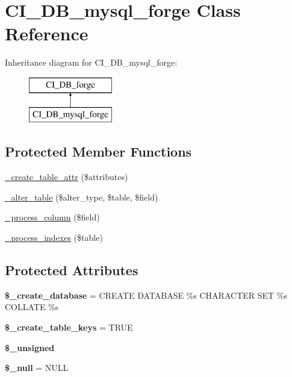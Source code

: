 \hypertarget{class_c_i___d_b__mysql__forge}{}\section{C\+I\+\_\+\+D\+B\+\_\+mysql\+\_\+forge Class Reference}
\label{class_c_i___d_b__mysql__forge}
Inheritance diagram for C\+I\+\_\+\+D\+B\+\_\+mysql\+\_\+forge\+:\begin{figure}[H]
\begin{center}
\leavevmode
\includegraphics[height=2.000000cm]{class_c_i___d_b__mysql__forge}
\end{center}
\end{figure}
\subsection*{Protected Member Functions}
\begin{DoxyCompactItemize}
\item 
\mbox{\hyperlink{class_c_i___d_b__mysql__forge_af4e8b947b456f4fdbf41ec02f9ec1c1e}{\+\_\+create\+\_\+table\+\_\+attr}} (\$attributes)
\item 
\mbox{\hyperlink{class_c_i___d_b__mysql__forge_a873b56e881c1d4cbb29a6526f091fef9}{\+\_\+alter\+\_\+table}} (\$alter\+\_\+type, \$table, \$field)
\item 
\mbox{\hyperlink{class_c_i___d_b__mysql__forge_adad9f5ac5abf479ef6b97bcded8ad6f0}{\+\_\+process\+\_\+column}} (\$field)
\item 
\mbox{\hyperlink{class_c_i___d_b__mysql__forge_a473840d89e768fdde06140be7e657f35}{\+\_\+process\+\_\+indexes}} (\$table)
\end{DoxyCompactItemize}
\subsection*{Protected Attributes}
\begin{DoxyCompactItemize}
\item 
\mbox{\label{class_c_i___d_b__mysql__forge_a4b4a0bed91fffb9da0d491cb5789d49a}} 
{\bfseries \$\+\_\+create\+\_\+database} = \textquotesingle{}C\+R\+E\+A\+TE D\+A\+T\+A\+B\+A\+SE \%s C\+H\+A\+R\+A\+C\+T\+ER S\+ET \%s C\+O\+L\+L\+A\+TE \%s\textquotesingle{}
\item 
\mbox{\label{class_c_i___d_b__mysql__forge_a00706a9880833c60145d078bd2be367f}} 
{\bfseries \$\+\_\+create\+\_\+table\+\_\+keys} = T\+R\+UE
\item 
{\bfseries \$\+\_\+unsigned}
\item 
\mbox{\label{class_c_i___d_b__mysql__forge_ae708c86220315ad2b42d1040ebdc58c4}} 
{\bfseries \$\+\_\+null} = \textquotesingle{}N\+U\+LL\textquotesingle{}
\end{DoxyCompactItemize}
